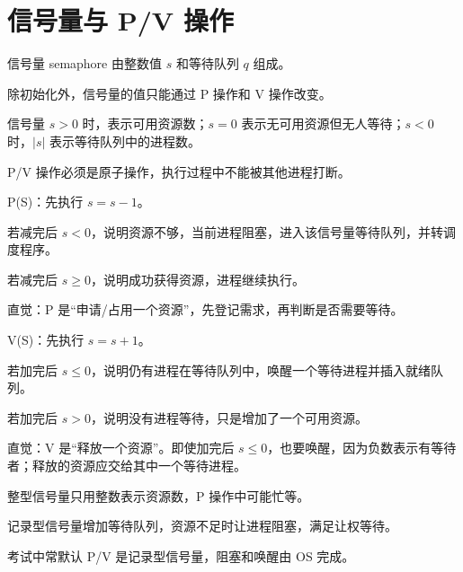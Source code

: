\section{信号量与 P/V 操作}
\begin{points}
  \item 信号量 semaphore 由整数值 $s$ 和等待队列 $q$ 组成。
  \item 除初始化外，信号量的值只能通过 P 操作和 V 操作改变。
  \item 信号量 $s>0$ 时，表示可用资源数；$s=0$ 表示无可用资源但无人等待；$s<0$ 时，$|s|$ 表示等待队列中的进程数。
  \item P/V 操作必须是原子操作，执行过程中不能被其他进程打断。
\end{points}


\begin{points}
  \item P(S)：先执行 $s=s-1$。
  \item 若减完后 $s<0$，说明资源不够，当前进程阻塞，进入该信号量等待队列，并转调度程序。
  \item 若减完后 $s\ge 0$，说明成功获得资源，进程继续执行。
  \item 直觉：P 是“申请/占用一个资源”，先登记需求，再判断是否需要等待。
\end{points}


\begin{points}
  \item V(S)：先执行 $s=s+1$。
  \item 若加完后 $s\le 0$，说明仍有进程在等待队列中，唤醒一个等待进程并插入就绪队列。
  \item 若加完后 $s>0$，说明没有进程等待，只是增加了一个可用资源。
  \item 直觉：V 是“释放一个资源”。即使加完后 $s\le 0$，也要唤醒，因为负数表示有等待者；释放的资源应交给其中一个等待进程。
\end{points}

\begin{points}
  \item 整型信号量只用整数表示资源数，P 操作中可能忙等。
  \item 记录型信号量增加等待队列，资源不足时让进程阻塞，满足让权等待。
  \item 考试中常默认 P/V 是记录型信号量，阻塞和唤醒由 OS 完成。
\end{points}


